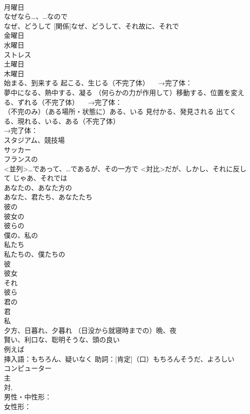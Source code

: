 \documentclass[8pt]{extreport}
\begin{document}
\begin{CJK}{UTF8}{min}
\\	月曜日
\\	なぜなら…、…なので
\\	[疑問]なぜ、どうして [関係]なぜ、どうして、それ故に、それで
\\	金曜日
\\	水曜日
\\	ストレス
\\	土曜日
\\	木曜日
\\	始まる、到来する 起こる、生じる（不完了体） 　→完了体：
\\	夢中になる、熱中する、凝る （何らかの力が作用して）移動する、位置を変える、ずれる（不完了体） 　→完了体：
\\	（不完のみ）（ある場所・状態に）ある、いる 見付かる、発見される 出てくる、現れる、いる、ある（不完了体） 
\\	→完了体：
\\	スタジアム、競技場
\\	サッカー
\\	フランスの
\\	<並列>…であって、…であるが、その一方で <対比>だが、しかし、それに反して じゃあ、それでは
\\	あなたの、あなた方の 
\\	あなた、君たち、あなたたち 
\\	彼の
\\	彼女の
\\	彼らの
\\	僕の、私の 
\\	私たち 
\\	私たちの、僕たちの 
\\	彼 
\\	彼女 
\\	それ 
\\	彼ら 
\\	君の 
\\	君 
\\	私 
\\	夕方、日暮れ、夕暮れ （日没から就寝時までの）晩、夜
\\	賢い、利口な、聡明そうな、頭の良い
\\	例えば
\\	挿入語：もちろん、疑いなく 助詞：[肯定]（口）もちろんそうだ、よろしい
\\	コンピューター
\\	主
\\	対, 
\\	男性・中性形：
\\	女性形：

\end{CJK}
\end{document}
